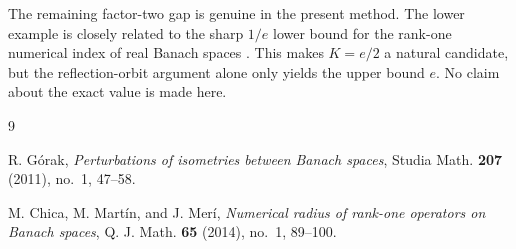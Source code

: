 \documentclass[11pt]{article}
\theoremstyle{remark}
\begin{document}
The remaining factor-two gap is genuine in the present method.  The lower
example is closely related to the sharp $1/e$ lower bound for the rank-one
numerical index of real Banach spaces \cite{ChicaMartinMeri}.  This makes
$K=e/2$ a natural candidate, but the reflection-orbit argument alone only
yields the upper bound $e$.  No claim about the exact value is made here.

\begin{thebibliography}{9}

R. G\'orak,
\emph{Perturbations of isometries between Banach spaces},
Studia Math. \textbf{207} (2011), no.~1, 47--58.

M. Chica, M. Mart\'in, and J. Mer\'i,
\emph{Numerical radius of rank-one operators on Banach spaces},
Q. J. Math. \textbf{65} (2014), no.~1, 89--100.

\end{thebibliography}
\end{document}

